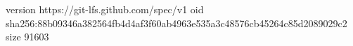 version https://git-lfs.github.com/spec/v1
oid sha256:88b09346a382564fb4d4af3f60ab4963e535a3c48576cb45264c85d2089029c2
size 91603
